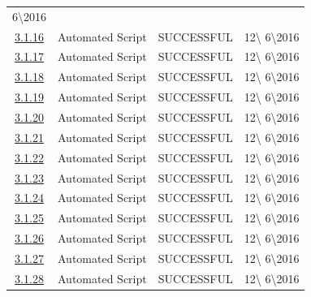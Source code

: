 \documentclass{article}
\begin{document}
\begin{table}[H]
\begin{tabularx}{\textwidth}{| c | l | X | l |}
	6\textbackslash2016\\
	\hyperref[sec:3.1.16]{3.1.16}& Automated Script  & SUCCESSFUL & 12\textbackslash
	6\textbackslash2016\\
	\hyperref[sec:3.1.17]{3.1.17}& Automated Script  & SUCCESSFUL & 12\textbackslash
	6\textbackslash2016\\
	\hyperref[sec:3.1.18]{3.1.18}& Automated Script  & SUCCESSFUL & 12\textbackslash
	6\textbackslash2016\\
	\hyperref[sec:3.1.19]{3.1.19}& Automated Script  & SUCCESSFUL & 12\textbackslash
	6\textbackslash2016\\
	\hyperref[sec:3.1.20]{3.1.20}& Automated Script  & SUCCESSFUL & 12\textbackslash
	6\textbackslash2016\\
	\hyperref[sec:3.1.21]{3.1.21}& Automated Script  & SUCCESSFUL & 12\textbackslash
	6\textbackslash2016\\
	\hyperref[sec:3.1.22]{3.1.22}& Automated Script  & SUCCESSFUL & 12\textbackslash
	6\textbackslash2016\\
	\hyperref[sec:3.1.23]{3.1.23}& Automated Script  & SUCCESSFUL & 12\textbackslash
	6\textbackslash2016\\
	\hyperref[sec:3.1.24]{3.1.24}& Automated Script  & SUCCESSFUL & 12\textbackslash
	6\textbackslash2016\\
	\hyperref[sec:3.1.25]{3.1.25}& Automated Script  & SUCCESSFUL & 12\textbackslash
	6\textbackslash2016\\
	\hyperref[sec:3.1.26]{3.1.26}& Automated Script  & SUCCESSFUL & 12\textbackslash
	6\textbackslash2016\\
	\hyperref[sec:3.1.27]{3.1.27}& Automated Script  & SUCCESSFUL & 12\textbackslash
	6\textbackslash2016\\
	\hyperref[sec:3.1.28]{3.1.28}& Automated Script  & SUCCESSFUL & 12\textbackslash
	6\textbackslash2016\\
		\bottomrule
	\end{tabularx}
\end{table}
\end{document}
